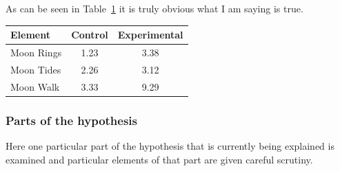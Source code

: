 As can be seen in Table~\ref{nothingelse} it is
truly obvious what I am saying is true.

\begin{landscape}
    \hfill
    \vfill
    \begin{table}[h!] \centering
        \label{nothingelse}
        \begin{tabular}{lcc} \hline
            \textbf{Element} & \textbf{Control} & \textbf{Experimental} \\ \hline
            Moon Rings       & 1.23             & 3.38                  \\
            Moon Tides       & 2.26             & 3.12                  \\
            Moon Walk        & 3.33             & 9.29                  \\ \hline
        \end{tabular}
    \end{table}
    \hfill
    \vfill
\end{landscape}

\subsubsection{Parts of the hypothesis}

Here one particular part of the hypothesis that is
currently being explained is examined and particular
elements of that part are given careful scrutiny.


